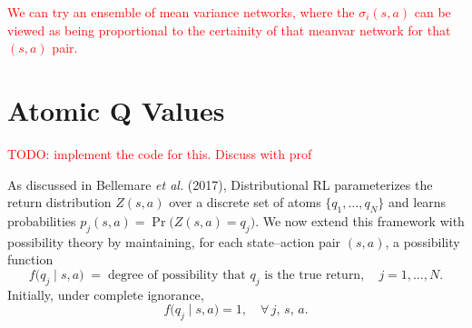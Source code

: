 \documentclass[12pt,a4paper]{report}
\newcommand\myworries[1]{\textcolor{red}{#1}}
\begin{document}
%
%
%
%
%


\myworries{We can try an ensemble of mean variance networks, where the $\sigma_i(s, a)$ can be viewed as being proportional to the certainity of that meanvar network for that $(s,a)$ pair.}

\section{Atomic Q Values}
\myworries{TODO: implement the code for this. Discuss with prof}\par
As discussed in Bellemare \emph{et al.} (2017), Distributional RL parameterizes the return distribution $Z(s,a)$ over a discrete set of atoms $\{q_1, \dots, q_N\}$ and learns probabilities $p_j(s,a) = \Pr\bigl(Z(s,a)=q_j\bigr)$. We now extend this framework with possibility theory by maintaining, for each state–action pair $(s,a)$, a possibility function
\[
  f\bigl(q_j \mid s,a\bigr) \;=\; \text{degree of possibility that }q_j\text{ is the true return},
  \quad j=1,\dots,N.
\]
Initially, under complete ignorance,
\[
  f\bigl(q_j \mid s,a\bigr) = 1,
  \quad \forall\,j,\,s,\,a.
\]
\end{document}
